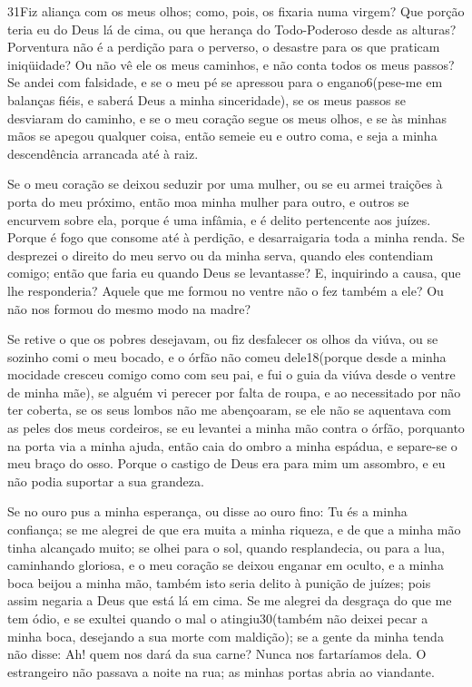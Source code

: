 \medskip

\lettrine{31} Fiz aliança com os meus olhos; como, pois, os
fixaria numa virgem? Que porção teria eu do Deus lá de cima, ou
que herança do Todo-Poderoso desde as alturas? Porventura não é
a perdição para o perverso, o desastre para os que praticam
iniqüidade? Ou não vê ele os meus caminhos, e não conta todos os
meus passos? Se andei com falsidade, e se o meu pé se apressou
para o engano6(pese-me em balanças fiéis, e saberá Deus a minha
sinceridade), se os meus passos se desviaram do caminho, e se o
meu coração segue os meus olhos, e se às minhas mãos se apegou
qualquer coisa, então semeie eu e outro coma, e seja a minha
descendência arrancada até à raiz.

Se o meu coração se deixou seduzir por uma mulher, ou se eu armei
traições à porta do meu próximo, então moa minha mulher para
outro, e outros se encurvem sobre ela, porque é uma infâmia,
e é delito pertencente aos juízes. Porque é fogo que consome
até à perdição, e desarraigaria toda a minha renda. Se
desprezei o direito do meu servo ou da minha serva, quando eles
contendiam comigo; então que faria eu quando Deus se
levantasse? E, inquirindo a causa, que lhe responderia?
Aquele que me formou no ventre não o fez também a ele? Ou não
nos formou do mesmo modo na madre?

Se retive o que os pobres desejavam, ou fiz desfalecer os olhos
da viúva, ou se sozinho comi o meu bocado, e o órfão não
comeu dele18(porque desde a minha mocidade cresceu comigo como com
seu pai, e fui o guia da viúva desde o ventre de minha mãe),
se alguém vi perecer por falta de roupa, e ao necessitado por
não ter coberta, se os seus lombos não me abençoaram, se ele
não se aquentava com as peles dos meus cordeiros, se eu
levantei a minha mão contra o órfão, porquanto na porta via a minha
ajuda, então caia do ombro a minha espádua, e separe-se o meu
braço do osso. Porque o castigo de Deus era para mim um
assombro, e eu não podia suportar a sua grandeza.

Se no ouro pus a minha esperança, ou disse ao ouro fino: Tu és a
minha confiança; se me alegrei de que era muita a minha
riqueza, e de que a minha mão tinha alcançado muito; se olhei
para o sol, quando resplandecia, ou para a lua, caminhando gloriosa,
e o meu coração se deixou enganar em oculto, e a minha boca
beijou a minha mão, também isto seria delito à punição de
juízes; pois assim negaria a Deus que está lá em cima. Se me
alegrei da desgraça do que me tem ódio, e se exultei quando o mal o
atingiu30(também não deixei pecar a minha boca, desejando a sua
morte com maldição); se a gente da minha tenda não disse: Ah!
quem nos dará da sua carne? Nunca nos fartaríamos dela. O
estrangeiro não passava a noite na rua; as minhas portas abria ao
viandante.

